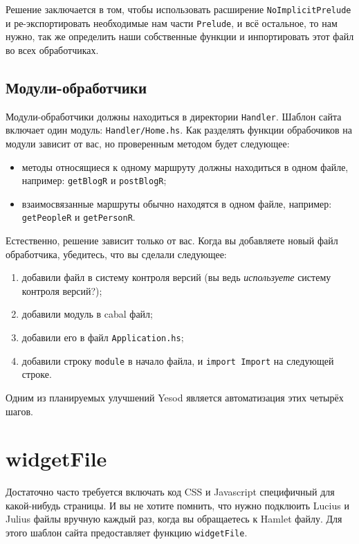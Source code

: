 Решение заключается в том, чтобы использовать расширение \texttt{NoImplicitPrelude} и
ре-экспортировать необходимые нам части \lstinline!Prelude!, и всё остальное, то нам нужно, так же
определить наши собственные функции и инпортировать этот файл во всех обработчиках.

\subsection{Модули-обработчики}

Модули-обработчики должны находиться в директории \lstinline!Handler!. Шаблон сайта включает один
модуль: \lstinline!Handler/Home.hs!. Как разделять функции обрабочиков на модули зависит от вас, но
проверенным методом будет следующее:
\begin{itemize}
  \item методы относящиеся к одному маршруту должны находиться в одном файле, например: \lstinline!getBlogR!
    и \lstinline!postBlogR!;
  \item взаимосвязанные маршруты обычно находятся в одном файле, например: \lstinline!getPeopleR! и \lstinline!getPersonR!.
\end{itemize}

Естественно, решение зависит только от вас. Когда вы добавляете новый файл обработчика, убедитесь,
что вы сделали следующее:
\begin{enumerate}
  \item добавили файл в систему контроля версий (вы ведь \emph{используете} систему контроля версий?);
  \item добавили модуль в cabal файл;
  \item добавили его в файл \texttt{Application.hs};
  \item добавили строку \lstinline!module! в начало файла, и \lstinline!import Import! на следующей строке.
\end{enumerate}

\begin{remark}
  Одним из планируемых улучшений Yesod является автоматизация этих четырёх шагов.
\end{remark}

\section{widgetFile}

Достаточно часто требуется включать код CSS и Javascript специфичный для какой-нибудь страницы.
И вы не хотите помнить, что нужно подклюить Lucius и Julius файлы вручную каждый раз,
когда вы обращаетесь к Hamlet файлу. Для этого шаблон сайта предоставляет
функцию \lstinline!widgetFile!.

